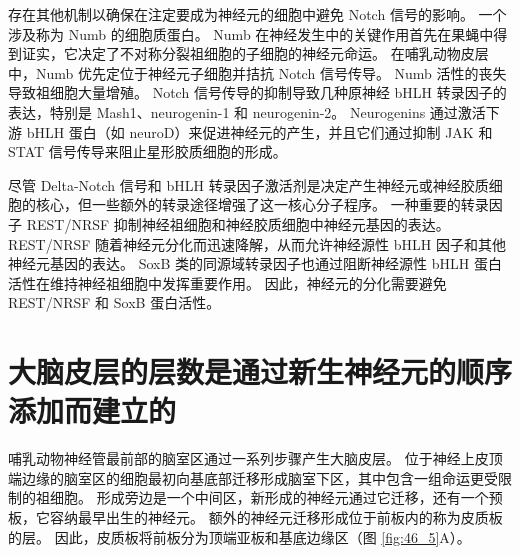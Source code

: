 存在其他机制以确保在注定要成为神经元的细胞中避免 Notch 信号的影响。 一个涉及称为 Numb 的细胞质蛋白。 Numb 在神经发生中的关键作用首先在果蝇中得到证实，它决定了不对称分裂祖细胞的子细胞的神经元命运。 在哺乳动物皮层中，Numb 优先定位于神经元子细胞并拮抗 Notch 信号传导。 Numb 活性的丧失导致祖细胞大量增殖。 Notch 信号传导的抑制导致几种原神经 bHLH 转录因子的表达，特别是 Mash1、neurogenin-1 和 neurogenin-2。 Neurogenins 通过激活下游 bHLH 蛋白（如 neuroD）来促进神经元的产生，并且它们通过抑制 JAK 和 STAT 信号传导来阻止星形胶质细胞的形成。

尽管 Delta-Notch 信号和 bHLH 转录因子激活剂是决定产生神经元或神经胶质细胞的核心，但一些额外的转录途径增强了这一核心分子程序。 一种重要的转录因子 REST/NRSF 抑制神经祖细胞和神经胶质细胞中神经元基因的表达。 REST/NRSF 随着神经元分化而迅速降解，从而允许神经源性 bHLH 因子和其他神经元基因的表达。 SoxB 类的同源域转录因子也通过阻断神经源性 bHLH 蛋白活性在维持神经祖细胞中发挥重要作用。 因此，神经元的分化需要避免 REST/NRSF 和 SoxB 蛋白活性。


\section{大脑皮层的层数是通过新生神经元的顺序添加而建立的}
哺乳动物神经管最前部的脑室区通过一系列步骤产生大脑皮层。 位于神经上皮顶端边缘的脑室区的细胞最初向基底部迁移形成脑室下区，其中包含一组命运更受限制的祖细胞。 形成旁边是一个中间区，新形成的神经元通过它迁移，还有一个预板，它容纳最早出生的神经元。 额外的神经元迁移形成位于前板内的称为皮质板的层。 
因此，皮质板将前板分为顶端亚板和基底边缘区（图 \ref{fig:46_5}A）。

